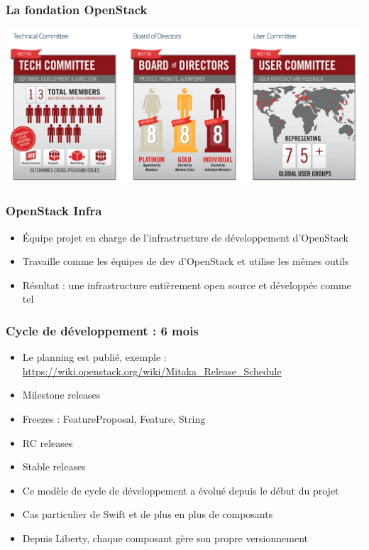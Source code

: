   \begin{frame}
    \frametitle{La fondation OpenStack}
      \includegraphics[width=\textwidth]{images/foundation.png}
  \end{frame}

  \begin{frame}
    \frametitle{OpenStack Infra}
    \begin{itemize}
      \item Équipe projet en charge de l'infrastructure de développement d'OpenStack
      \item Travaille comme les équipes de dev d'OpenStack et utilise les mêmes outils
      \item Résultat : une infrastructure entièrement open source et développée comme tel
    \end{itemize}
  \end{frame}

  \begin{frame}
    \frametitle{Cycle de développement : 6 mois}
    \begin{itemize}
      \item Le planning est publié, exemple : \url{https://wiki.openstack.org/wiki/Mitaka_Release_Schedule}
      \item Milestone releases
      \item Freezes : FeatureProposal, Feature, String
      \item RC releases
      \item Stable releases
      \item Ce modèle de cycle de développement a évolué depuis le début du projet
      \item Cas particulier de Swift et de plus en plus de composants
      \item Depuis Liberty, chaque composant gère son propre versionnement
    \end{itemize}
  \end{frame}

